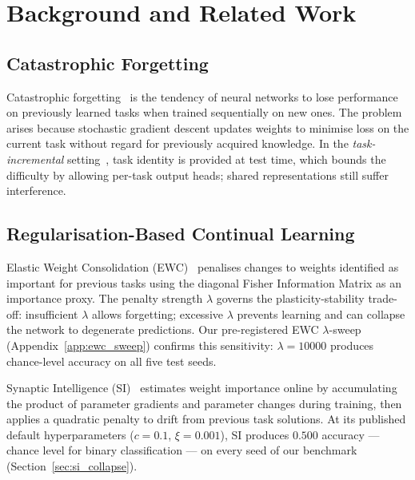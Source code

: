 
\section{Background and Related Work}
\label{sec:background}

\subsection{Catastrophic Forgetting}

Catastrophic forgetting~\cite{McCloskey1989} is the tendency of neural networks to
lose performance on previously learned tasks when trained sequentially on new ones.
The problem arises because stochastic gradient descent updates weights to minimise loss
on the current task without regard for previously acquired knowledge.
In the \emph{task-incremental} setting~\cite{vandeVen2019}, task identity is
provided at test time, which bounds the difficulty by allowing per-task output heads;
shared representations still suffer interference.

\subsection{Regularisation-Based Continual Learning}

Elastic Weight Consolidation (EWC)~\cite{Kirkpatrick2017} penalises changes to
weights identified as important for previous tasks using the diagonal Fisher
Information Matrix as an importance proxy.
The penalty strength $\lambda$ governs the plasticity-stability trade-off: insufficient
$\lambda$ allows forgetting; excessive $\lambda$ prevents learning and can collapse the
network to degenerate predictions.
Our pre-registered EWC $\lambda$-sweep (Appendix~\ref{app:ewc_sweep}) confirms this
sensitivity: $\lambda = 10000$ produces chance-level accuracy on all five test seeds.

Synaptic Intelligence (SI)~\cite{Zenke2017} estimates weight importance online
by accumulating the product of parameter gradients and parameter changes during
training, then applies a quadratic penalty to drift from previous task solutions.
At its published default hyperparameters ($c = 0.1$, $\xi = 0.001$), SI produces
$0.500$ accuracy — chance level for binary classification — on every seed of our
benchmark (Section~\ref{sec:si_collapse}).

